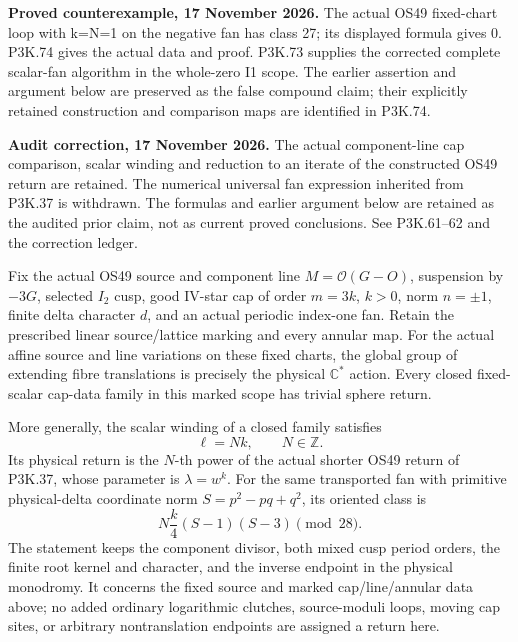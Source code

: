 \begin{theorem}\label{night:P3K.44}
\par\noindent\textbf{Proved counterexample, 17 November 2026.} The actual OS49 fixed-chart loop with k=N=1 on the negative fan has class 27; its displayed formula gives 0. P3K.74 gives the actual data and proof. P3K.73 supplies the corrected complete scalar-fan algorithm in the whole-zero I1 scope. The earlier assertion and argument below are preserved as the false compound claim; their explicitly retained construction and comparison maps are identified in P3K.74.

\par\noindent\textbf{Audit correction, 17 November 2026.} The actual component-line cap comparison, scalar winding and reduction to an iterate of the constructed OS49 return are retained. The numerical universal fan expression inherited from P3K.37 is withdrawn. The formulas and earlier argument below are retained as the audited prior claim, not as current proved conclusions. See P3K.61--62 and the correction ledger.
\medskip


Fix the actual OS49 source and component line
\(M=\mathcal O(G-O)\), suspension by \(-3G\), selected
\(I_2\) cusp, good IV-star cap of order \(m=3k\), \(k>0\),
norm \(n=\pm1\), finite delta character \(d\), and an actual
periodic index-one fan. Retain the prescribed linear source/lattice
marking and every annular map. For the actual affine source and line
variations on these fixed charts, the global group of extending fibre
translations is precisely the physical \(\mathbb C^*\) action.
Every closed fixed-scalar cap-data family in this marked scope has
trivial sphere return.

More generally, the scalar winding of a closed family satisfies
\[
                          \ell=Nk,\qquad N\in\mathbb Z.
\]
Its physical return is the \(N\)-th power of the actual shorter
OS49 return of P3K.37, whose parameter is \(\lambda=w^k\).
For the same transported fan with primitive physical-delta coordinate
norm \(S=p^2-pq+q^2\), its oriented class is
\[
                       N\frac{k}{4}(S-1)(S-3)\pmod{28}.
\]
The statement keeps the component divisor, both mixed cusp period
orders, the finite root kernel and character, and the inverse endpoint
in the physical monodromy. It concerns the fixed source and marked
cap/line/annular data above; no added ordinary logarithmic clutches,
source-moduli loops, moving cap sites, or arbitrary nontranslation
endpoints are assigned a return here.

\end{theorem}
